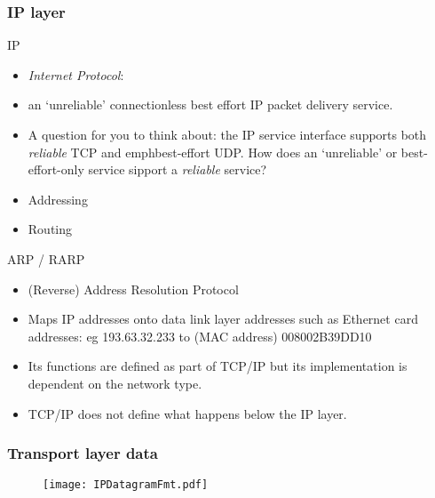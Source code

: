 \documentclass[10pt, hyperref={pdfpagelabels=false}]{beamer}
\begin{document}
\begin{frame}
\frametitle{IP layer}
IP
\begin{itemize}
\item \emph{\color{blue}Internet Protocol}:
\item an `unreliable' connectionless best effort IP packet delivery service.
\item A question for you to think about: the IP service interface supports both \emph{reliable} TCP and emph{best-effort} UDP. How does an `unreliable' or best-effort-only service sipport a \emph{reliable} service?
\item Addressing
\item Routing
\end{itemize}

ARP / RARP
\begin{itemize}
\item (Reverse) Address Resolution Protocol
\item Maps IP addresses onto data link layer addresses such as Ethernet card addresses: eg 193.63.32.233 to (MAC address) 008002B39DD10
\item Its functions are defined as part of TCP/IP but its implementation is dependent on the network type.
\item TCP/IP does not define what happens below the IP layer.
\end{itemize}
\end{frame}

\begin{frame}
\frametitle{Transport layer data}
\begin{figure}[!htb]
\begin{center}
\texttt{[image: IPDatagramFmt.pdf]}
\end{center}
\end{figure}
\end{frame}
\end{document}
